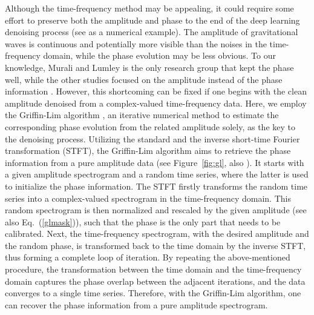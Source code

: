 \documentclass[preprint,12pt]{elsarticle}
\begin{document}
Although the time-frequency method may be appealing, it could require some effort to preserve both the amplitude and phase to the end of the deep learning denoising process (see \cite{virtuoso2024wavelet} as a numerical example).
The amplitude of gravitational waves is continuous and potentially more visible than the noises in the time-frequency domain, while the phase evolution may be less obvious.
To our knowledge, Murali and Lumley  \cite{murali2023detecting} is the only research group that kept the phase well, while the other studies focused on the amplitude instead of the phase information \cite{kato2022validation, ghalsasi2023amplifying, jadhav2023towards, wang2024rapid}.
However, this shortcoming can be fixed if one begins with the clean amplitude denoised from a complex-valued time-frequency data. 
Here, we employ the Griffin-Lim algorithm \cite{griffin1984signal}, an iterative numerical method to estimate the corresponding phase evolution from the related amplitude solely, as the key to the denoising process. 
Utilizing the standard and the inverse short-time Fourier transformation (STFT), the Griffin-Lim algorithm aims to retrieve the phase information from a pure amplitude data (see Figure~\ref{fig:gl}, also \cite{liu2021novel}). 
It starts with a given amplitude spectrogram and a random time series, where the latter is used to initialize the phase information. 
The STFT firstly transforms the random time series into a complex-valued spectrogram in the time-frequency domain.
This random spectrogram is then normalized and rescaled by the given amplitude (see also Eq.~(\ref{glmask})), such that the phase is the only part that needs to be calibrated.
Next, the time-frequency spectrogram, with the desired amplitude and the random phase, is transformed back to the time domain by the inverse STFT, thus forming a complete loop of iteration.
By repeating the above-mentioned procedure, the transformation between the time domain and the time-frequency domain captures the phase overlap between the adjacent iterations, and the data converges to a single time series.
Therefore, with the Griffin-Lim algorithm, one can recover the phase information from a pure amplitude spectrogram.
\end{document}
